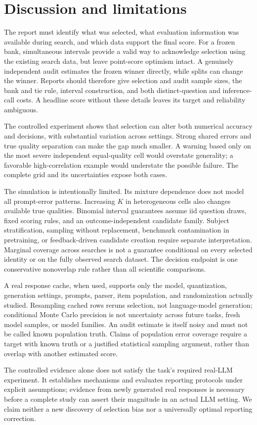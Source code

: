 \section{Discussion and limitations}
The report must identify what was selected, what evaluation information was available during search, and which data support the final score. For a frozen bank, simultaneous intervals provide a valid way to acknowledge selection using the existing search data, but leave point-score optimism intact. A genuinely independent audit estimates the frozen winner directly, while splits can change the winner. Reports should therefore give selection and audit sample sizes, the bank and tie rule, interval construction, and both distinct-question and inference-call costs. A headline score without these details leaves its target and reliability ambiguous.

The controlled experiment shows that selection can alter both numerical accuracy and decisions, with substantial variation across settings. Strong shared errors and true quality separation can make the gap much smaller. A warning based only on the most severe independent equal-quality cell would overstate generality; a favorable high-correlation example would understate the possible failure. The complete grid and its uncertainties expose both cases.

The simulation is intentionally limited. Its mixture dependence does not model all prompt-error patterns. Increasing $K$ in heterogeneous cells also changes available true qualities. Binomial interval guarantees assume iid question draws, fixed scoring rules, and an outcome-independent candidate family. Subject stratification, sampling without replacement, benchmark contamination in pretraining, or feedback-driven candidate creation require separate interpretation. Marginal coverage across searches is not a guarantee conditional on every selected identity or on the fully observed search dataset. The decision endpoint is one conservative nonoverlap rule rather than all scientific comparisons.

A real response cache, when used, supports only the model, quantization, generation settings, prompts, parser, item population, and randomization actually studied. Resampling cached rows reruns selection, not language-model generation; conditional Monte Carlo precision is not uncertainty across future tasks, fresh model samples, or model families. An audit estimate is itself noisy and must not be called known population truth. Claims of population error coverage require a target with known truth or a justified statistical sampling argument, rather than overlap with another estimated score.

The controlled evidence alone does not satisfy the task's required real-LLM experiment. It establishes mechanisms and evaluates reporting protocols under explicit assumptions; evidence from newly generated real responses is necessary before a complete study can assert their magnitude in an actual LLM setting. We claim neither a new discovery of selection bias nor a universally optimal reporting correction.
